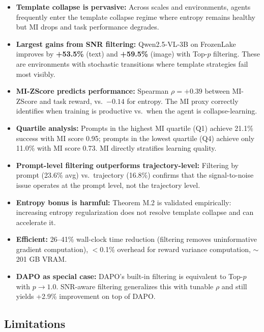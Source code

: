 \documentclass[11pt]{article}
\begin{document}
\begin{itemize}
    \item \textbf{Template collapse is pervasive:} Across scales and environments, agents frequently enter the template collapse regime where entropy remains healthy but MI drops and task performance degrades.

    \item \textbf{Largest gains from SNR filtering:} Qwen2.5-VL-3B on FrozenLake improves by \textbf{+53.5\%} (text) and \textbf{+59.5\%} (image) with Top-$p$ filtering. These are environments with stochastic transitions where template strategies fail most visibly.

    \item \textbf{MI-ZScore predicts performance:} Spearman $\rho = +0.39$ between MI-ZScore and task reward, vs.\ $-0.14$ for entropy. The MI proxy correctly identifies when training is productive vs.\ when the agent is collapse-learning.

    \item \textbf{Quartile analysis:} Prompts in the highest MI quartile (Q1) achieve 21.1\% success with MI score 0.95; prompts in the lowest quartile (Q4) achieve only 11.0\% with MI score 0.73. MI directly stratifies learning quality.

    \item \textbf{Prompt-level filtering outperforms trajectory-level:} Filtering by prompt (23.6\% avg) vs.\ trajectory (16.8\%) confirms that the signal-to-noise issue operates at the prompt level, not the trajectory level.

    \item \textbf{Entropy bonus is harmful:} Theorem M.2 is validated empirically: increasing entropy regularization does not resolve template collapse and can accelerate it.

    \item \textbf{Efficient:} 26--41\% wall-clock time reduction (filtering removes uninformative gradient computation), $<$0.1\% overhead for reward variance computation, $\sim$201 GB VRAM.

    \item \textbf{DAPO as special case:} DAPO's built-in filtering is equivalent to Top-$p$ with $p \to 1.0$. SNR-aware filtering generalizes this with tunable $\rho$ and still yields +2.9\% improvement on top of DAPO.
\end{itemize}

\subsection{Limitations}
\end{document}
